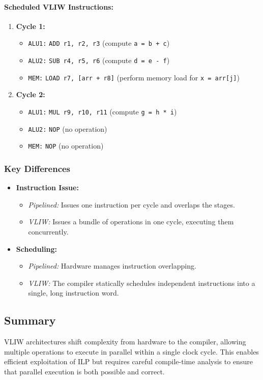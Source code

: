 \paragraph{Scheduled VLIW Instructions:}
\begin{enumerate}
    \item \textbf{Cycle 1:}
    \begin{itemize}
        \item \texttt{ALU1:} \texttt{ADD r1, r2, r3} \quad (compute \texttt{a = b + c})
        \item \texttt{ALU2:} \texttt{SUB r4, r5, r6} \quad (compute \texttt{d = e - f})
        \item \texttt{MEM:} \texttt{LOAD r7, [arr + r8]} \quad (perform memory load for \texttt{x = arr[j]})
    \end{itemize}
    \item \textbf{Cycle 2:}
    \begin{itemize}
        \item \texttt{ALU1:} \texttt{MUL r9, r10, r11} \quad (compute \texttt{g = h * i})
        \item \texttt{ALU2:} \texttt{NOP} \quad (no operation)
        \item \texttt{MEM:} \texttt{NOP} \quad (no operation)
    \end{itemize}
\end{enumerate}

\subsubsection*{Key Differences}
\begin{itemize}
    \item \textbf{Instruction Issue:}
    \begin{itemize}
        \item \emph{Pipelined:} Issues one instruction per cycle and overlaps the stages.
        \item \emph{VLIW:} Issues a bundle of operations in one cycle, executing them concurrently.
    \end{itemize}
    \item \textbf{Scheduling:}
    \begin{itemize}
        \item \emph{Pipelined:} Hardware manages instruction overlapping.
        \item \emph{VLIW:} The compiler statically schedules independent instructions into a single, long instruction word.
    \end{itemize}
\end{itemize}

\subsection{Summary}
VLIW architectures shift complexity from hardware to the compiler, allowing multiple operations to execute in parallel within a single clock cycle. This enables efficient exploitation of ILP but requires careful compile-time analysis to ensure that parallel execution is both possible and correct.

